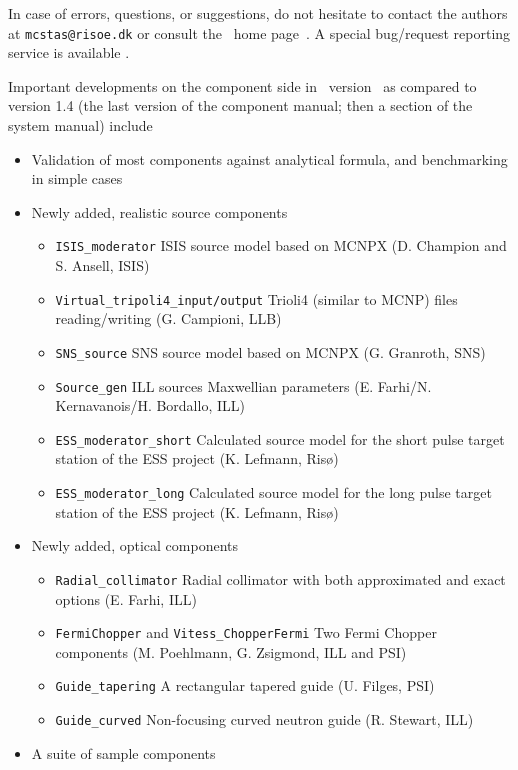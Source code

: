 In case of errors, questions, or suggestions,
do not hesitate to
contact the authors at \verb+mcstas@risoe.dk+
or consult the \MCS\ home page~\cite{mcstas_webpage}. A special bug/request reporting service is available \cite{mczilla_webpage}.

Important developments on the component side in \MCS\ version \version\
as compared to version 1.4 (the last version of the component manual;
then a section of the system manual) include

\begin{itemize}
\item{Validation of most components against analytical formula,
and benchmarking in simple cases}
\item{Newly added, realistic source components}
  \begin{itemize}
  \item \verb+ISIS_moderator+ ISIS source model based on MCNPX (D. Champion and S. Ansell, ISIS)
  \item \verb+Virtual_tripoli4_input/output+ Trioli4 (similar to MCNP) files reading/writing (G. Campioni, LLB)
  \item \verb+SNS_source+ SNS source model based on MCNPX (G. Granroth, SNS)
  \item \verb+Source_gen+ ILL sources Maxwellian parameters (E. Farhi/N. Kernavanois/H. Bordallo, ILL)
  \item \verb+ESS_moderator_short+ Calculated source model for the short pulse target station of the ESS project (K. Lefmann, Ris\o )
  \item \verb+ESS_moderator_long+ Calculated source model for the long pulse target station of the ESS project (K. Lefmann, Ris\o )
  \end{itemize}
\item{Newly added, optical components}
  \begin{itemize}
  \item \verb+Radial_collimator+ Radial collimator with both approximated and exact options (E. Farhi, ILL)
  \item \verb+FermiChopper+ and \verb+Vitess_ChopperFermi+ Two Fermi Chopper components (M. Poehlmann, G. Zsigmond, ILL and PSI)
  \item \verb+Guide_tapering+ A rectangular tapered guide (U. Filges, PSI)
  \item \verb+Guide_curved+  Non-focusing curved neutron guide (R. Stewart, ILL)
  \end{itemize}
\item{A suite of sample components}

\end{itemize}
